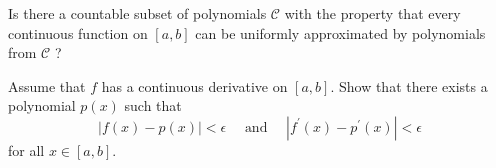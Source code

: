 \begin{exercise}
    Is there a countable subset of polynomials $\mathcal{C}$ with the property that every continuous function on $[a, b]$ can be uniformly approximated by polynomials from $\mathcal{C}$ ?
\end{exercise}
\begin{solution}
    \TODO
\end{solution}

\begin{exercise}
    Assume that $f$ has a continuous derivative on $[a, b]$. Show that there exists a polynomial $p(x)$ such that
$$
|f(x)-p(x)|<\epsilon \quad \text { and } \quad\left|f^{\prime}(x)-p^{\prime}(x)\right|<\epsilon
$$
for all $x \in[a, b]$.
\end{exercise}
